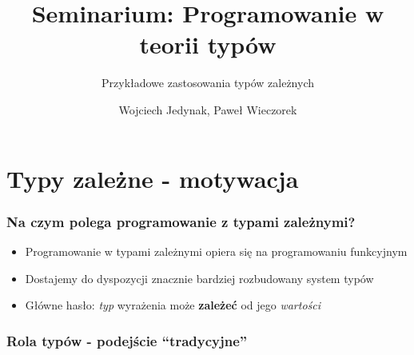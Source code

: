 \documentclass{beamer}
\title{Seminarium: Programowanie w teorii typów}
\subtitle{Przykładowe zastosowania typów zależnych}
\author{Wojciech Jedynak, Paweł Wieczorek}
\institute{Instytut Informatyki Uniwersytetu Wrocławskiego}
\begin{document}

\maketitle




\section{Typy zależne - motywacja}

\begin{frame}
\frametitle{Na czym polega programowanie z typami zależnymi?}

\begin{itemize}

\item Programowanie w typami zależnymi opiera się na programowaniu funkcyjnym
\item Dostajemy do dyspozycji znacznie bardziej rozbudowany system typów
\item Główne hasło: \emph{typ} wyrażenia może {\bf zależeć} od jego \emph{wartości}

\end{itemize}

\end{frame}


\begin{frame}
\frametitle{Rola typów - podejście ``tradycyjne''}

\end{frame}








\end{document}
